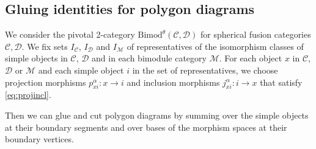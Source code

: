 \documentclass[1.5pt, a4paper]{article}
\newcommand{\mac}{\mathcal C}
\newcommand{\mad}{\mathcal D}
\newcommand{\mam}{\mathcal M}
\newcommand{\Bimod}{\mathrm{Bimod}}
\begin{document}
\subsection{Gluing identities for polygon diagrams}

We consider the pivotal 2-category $\Bimod^\theta(\mac,\mad)$ for spherical fusion categories $\mac,\mad$.
We fix sets  $I_\mac$, $I_\mad$  and $I_\mam$ of representatives of the isomorphism classes of simple objects in $\mac$, $\mad$ and in each bimodule category  
$\mam$.  For each object $x$ in $\mac$, $\mad$ or $\mam$ and each simple object $i$ in the set of representatives, we choose projection morphisms $p^\alpha_{xi}: x\to i$ and inclusion morphisms $j^\alpha_{xi}:i\to x$ that satisfy  \eqref{eq:projincl}. 

Then we can glue and cut  polygon diagrams by summing  over the simple objects at their boundary segments and over bases of the morphism spaces at their boundary vertices.
\end{document}
